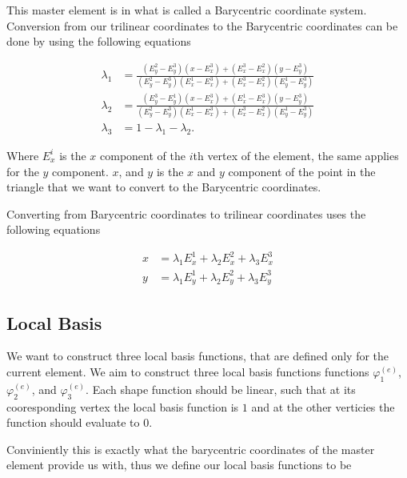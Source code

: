 \documentclass[../fem.tex]{subfiles}
\begin{document}
This master element is in what is called a Barycentric coordinate system.
Conversion from our trilinear coordinates to the Barycentric coordinates can be
done by using the following equations

\begin{align*}
  \lambda_1 &=
  \frac{\left(E^2_y-E^3_y\right)\left(x-E^3_x\right)+\left(E^3_x-E^2_x\right)\left(y-E^3_y\right)}{\left(E^2_y-E^3_y\right)\left(E^1_x-E^3_x\right)+\left(E^3_x-E^2_x\right)\left(E^1_y-E^3_y\right)}\\
  \lambda_2 &=
  \frac{\left(E^3_y-E^1_y\right)\left(x-E^3_x\right)+\left(E^1_x-E^3_x\right)\left(y-E^3_y\right)}{\left(E^2_y-E^3_y\right)\left(E^1_x-E^3_x\right)+\left(E^3_x-E^2_x\right)\left(E^1_y-E^3_y\right)}\\
  \lambda_3 &= 1-\lambda_1-\lambda_2.
\end{align*}

Where $E^i_x$ is the $x$ component of the $i$th vertex of the element, the same
applies for the $y$ component. $x$, and $y$ is the $x$ and $y$ component of the
point in the triangle that we want to convert to the Barycentric coordinates.

Converting from Barycentric coordinates to trilinear coordinates uses the
following equations

\begin{align*}
  x &= \lambda_1 E^1_x+\lambda_2 E^2_x + \lambda_3 E^3_x\\
  y &= \lambda_1 E^1_y +\lambda_2 E^2_y + \lambda_3 E^3_y
\end{align*}

\subsection{Local Basis}%
\label{sub:local_basis}


We want to construct three local basis functions, that are defined only for the
current element. We aim to construct three local basis functions functions
$\varphi_1^{(e)}$, $\varphi_2^{(e)}$, and $\varphi_3^{(e)}$.  Each shape
function should be linear, such that at its cooresponding vertex the local
basis function is $1$ and at the other verticies the function should evaluate
to $0$.


Conviniently this is exactly what the barycentric coordinates of the master
element provide us with, thus we define our local basis functions to be
\end{document}
